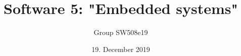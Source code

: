 \title{Software 5: "Embedded systems"} %
\date{19. December 2019}                                                        %
\def\groupnumber{Group SW508e19}                                                  %
\author{\groupnumber}                                                             %

\let\theauthor\author
\let\thedate\date


